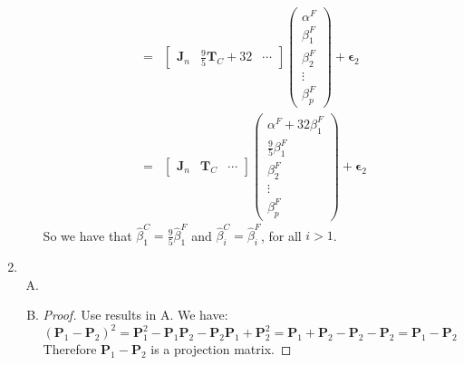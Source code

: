 \documentclass[12pt]{article}
\newcommand{\ttt}[1]{\textbf{#1}}
\begin{document}
\begin{enumerate}
\begin{enumerate}[A.]
\begin{eqnarray}
                    &=& \begin{bmatrix} \ttt{J}_n & \frac{9}{5}\ttt{T}_C + 32 & \cdots \end{bmatrix} \begin{pmatrix} \alpha^F\\ \beta^F_1\\ \beta^F_2\\ \vdots\\ \beta^F_p \end{pmatrix} + \bm{\epsilon}_2 \\
                    &=& \begin{bmatrix} \ttt{J}_n&\ttt{T}_C&\cdots \end{bmatrix} \begin{pmatrix} \alpha^F + 32 \beta^F_1 \\ \frac{9}{5} \beta^F_1\\ \beta^F_2\\ \vdots\\ \beta^F_p \end{pmatrix} + \bm{\epsilon}_2
        \end{eqnarray}
        So we have that $\hat{\beta}^C_1 = \frac{9}{5} \hat{\beta}^F_1$ and $\hat{\beta}^C_i = \hat{\beta}^F_i$, for all $i > 1$.
    \end{enumerate}

    \item
    \begin{enumerate}[A.]
        \item 
        \item 
        \begin{proof}
            Use results in A. We have:
            $$(\ttt{P}_1 - \ttt{P}_2)^2 = \ttt{P}_1^2 - \ttt{P}_1\ttt{P}_2 -\ttt{P}_2\ttt{P}_1 + \ttt{P}_2^2 = \ttt{P}_1 + \ttt{P}_2 - \ttt{P}_2 - \ttt{P}_2 = \ttt{P}_1 - \ttt{P}_2$$
            Therefore $\ttt{P}_1 - \ttt{P}_2$ is a projection matrix.
        \end{proof}
    \end{enumerate}

\end{enumerate}
\end{document}
